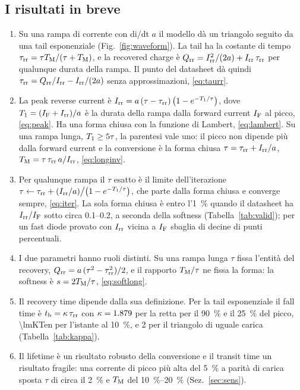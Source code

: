 \documentclass[10pt,a4paper]{scrartcl}
\let\newcommand\lmitdefine
\newcommand{\IF}{I_\mathrm{F}}
\newcommand{\Irr}{I_\mathrm{rr}}
\newcommand{\Qrr}{Q_\mathrm{rr}}
\newcommand{\tb}{t_\mathrm{b}}
\newcommand{\taurr}{\tau_\mathrm{rr}}
\newcommand{\TM}{T_\mathrm{M}}
\newcommand{\Tone}{T_1}
\begin{document}
\subsection*{I risultati in breve}
\begin{enumerate}
\item Su una rampa di corrente con di/dt $a$ il modello dà un triangolo seguito da una tail esponenziale (Fig.~\ref{fig:waveform}). La tail ha la costante di tempo $\taurr = \tau\TM/(\tau+\TM)$, e la recovered charge è $\Qrr = \Irr^2/(2a) + \Irr\,\taurr$ per qualunque durata della rampa. Il punto del datasheet dà quindi $\taurr = \Qrr/\Irr - \Irr/(2a)$ senza approssimazioni, \eqref{eq:taurr}.
\item La peak reverse current è $\Irr = a\,(\tau-\taurr)\,\bigl(1-e^{-\Tone/\tau}\bigr)$, dove $\Tone = (\IF+\Irr)/a$ è la durata della rampa dalla forward current $\IF$ al picco, \eqref{eq:peak}. Ha una forma chiusa con la funzione di Lambert, \eqref{eq:lambert}. Su una rampa lunga, $\Tone \geq 5\tau$, la parentesi vale uno: il picco non dipende più dalla forward current e la conversione è la forma chiusa $\tau = \taurr + \Irr/a$, $\TM = \tau\,\taurr\,a/\Irr$, \eqref{eq:longinv}.
\item Per qualunque rampa il $\tau$ esatto è il limite dell'iterazione $\tau \leftarrow \taurr + (\Irr/a)\big/\bigl(1-e^{-\Tone/\tau}\bigr)$, che parte dalla forma chiusa e converge sempre, \eqref{eq:iter}. La sola forma chiusa è entro l'\SI{1}{\percent} quando il datasheet ha $\Irr/\IF$ sotto circa \numrange{0.1}{0.2}, a seconda della softness (Tabella~\ref{tab:valid}); per un fast diode provato con $\Irr$ vicina a $\IF$ sbaglia di decine di punti percentuali.
\item I due parametri hanno ruoli distinti. Su una rampa lunga $\tau$ fissa l'entità del recovery, $\Qrr = a\,(\tau^2-\taurr^2)/2$, e il rapporto $\TM/\tau$ ne fissa la forma: la softness è $s = 2\TM/\tau$, \eqref{eq:softlong}.
\item Il recovery time dipende dalla sua definizione. Per la tail esponenziale il fall time è $\tb = \kappa\,\taurr$ con $\kappa = 1.879$ per la retta per il \SI{90}{\percent} e il \SI{25}{\percent} del picco, \num{\lmKTen} per l'istante al \SI{10}{\percent}, e 2 per il triangolo di uguale carica (Tabella~\ref{tab:kappa}).
\item Il lifetime è un risultato robusto della conversione e il transit time un risultato fragile: una corrente di picco più alta del \SI{5}{\percent} a parità di carica sposta $\tau$ di circa il \SI{2}{\percent} e $\TM$ del \SIrange{10}{20}{\percent} (Sez.~\ref{sec:sens}).

\end{enumerate}
\end{document}
